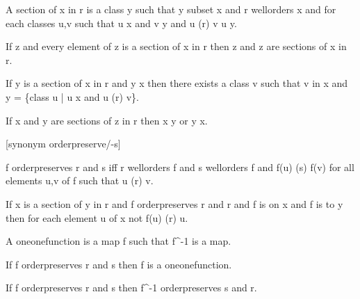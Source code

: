 \documentclass[a4paper,draft]{amsproc}
\begin{document}
\begin{forthel}
\begin{definition}[89]
A section of x in r is a class y such that y subset x and r wellorders x
and for each classes u,v such that u \in x and v \in y and u (r) v u \in y.
\end{definition}

\begin{theorem}[90]
If z  and every element of z is a section of x in r then \bigcup z and \bigcap z are sections of x in r.
\end{theorem}

\begin{theorem}[91]
If y is a section of x in r and y \neq x then there exists a class v such that v in x and 
y = \{class u | u \in x and u (r) v\}.
\end{theorem}

\begin{theorem}[92]
If x and y are sections of z in r then x \subset y or y \subset x.
\end{theorem}

[synonym orderpreserve/-s]
\begin{definition}[93]
f orderpreserves r and s iff r wellorders \domain f and s wellorders \range f
and f(u) (s) f(v) for all elements u,v of \domain f such that u (r) v.
\end{definition}

\begin{theorem}[94]
If x is a section of y in r and f orderpreserves r and r and f is on x and f is to y
then for each element u of x not f(u) (r) u.
\end{theorem}

\begin{definition}[95]
A oneonefunction is a map f such that f^{-1} is a map.
\end{definition}

\begin{theorem}[96a]
If f orderpreserves r and s then f is a oneonefunction.
\end{theorem}

\begin{theorem}[96b]
If f orderpreserves r and s then f^{-1} orderpreserves s and r.
\end{theorem}


\end{forthel}
\end{document}
